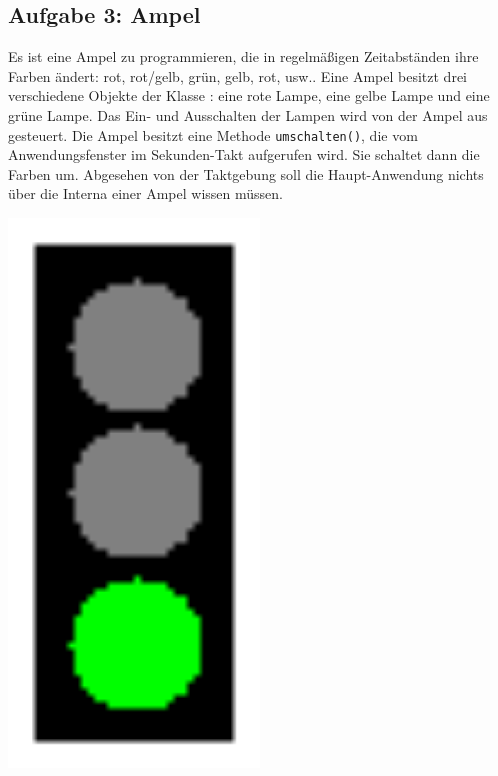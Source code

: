\subsection{Aufgabe 3: Ampel}

\begin{minipage}{0.9\textwidth}
Es ist eine Ampel zu programmieren, die in regelmäßigen Zeitabständen ihre
Farben ändert: rot, rot/gelb, grün, gelb, rot, usw.. Eine Ampel besitzt drei
verschiedene Objekte der Klasse : eine rote Lampe, eine gelbe
Lampe und eine grüne Lampe. Das Ein- und Ausschalten der Lampen wird von der
Ampel aus gesteuert. Die Ampel besitzt eine Methode \lstinline|umschalten()|,
die vom Anwendungsfenster im Sekunden-Takt aufgerufen wird. Sie schaltet dann
die Farben um. Abgesehen von der Taktgebung soll die Haupt-Anwendung nichts
über die Interna einer Ampel wissen müssen.
\end{minipage}
\begin{minipage}{0.1\textwidth}
\begin{center}
\includegraphics[width=0.5\textwidth]{./inf/SEKII/12_Java_Datenkapselung/ampel.png}
\end{center}
\end{minipage}

